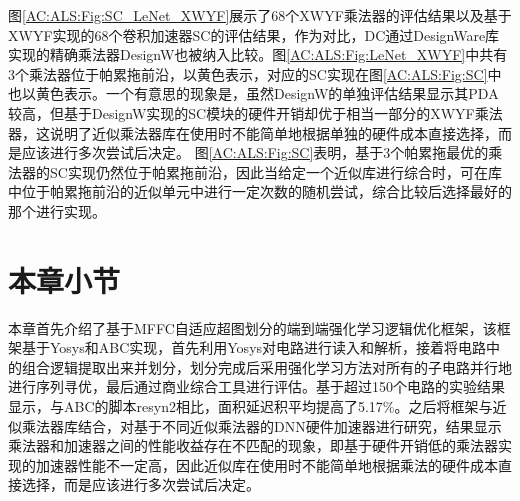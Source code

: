 图\ref{AC:ALS:Fig:SC_LeNet_XWYF}展示了68个XWYF乘法器的评估结果以及基于XWYF实现的68个卷积加速器SC\cite{Accelerator:SC}的评估结果，作为对比，DC通过DesignWare库\cite{IP:DesignWare}实现的精确乘法器DesignW也被纳入比较。图\ref{AC:ALS:Fig:LeNet_XWYF}中共有3个乘法器位于帕累拖前沿，以黄色表示，对应的SC实现在图\ref{AC:ALS:Fig:SC}中也以黄色表示。一个有意思的现象是，虽然DesignW的单独评估结果显示其PDA较高，但基于DesignW实现的SC模块的硬件开销却优于相当一部分的XWYF乘法器，这说明了近似乘法器库在使用时不能简单地根据单独的硬件成本直接选择，而是应该进行多次尝试后决定。
图\ref{AC:ALS:Fig:SC}表明，基于3个帕累拖最优的乘法器的SC实现仍然位于帕累拖前沿，因此当给定一个近似库进行综合时，可在库中位于帕累拖前沿的近似单元中进行一定次数的随机尝试，综合比较后选择最好的那个进行实现。

\section{本章小节}

本章首先介绍了基于MFFC自适应超图划分的端到端强化学习逻辑优化框架，该框架基于Yosys和ABC实现，首先利用Yosys对电路进行读入和解析，接着将电路中的组合逻辑提取出来并划分，划分完成后采用强化学习方法对所有的子电路并行地进行序列寻优，最后通过商业综合工具进行评估。基于超过150个电路的实验结果显示，与ABC的脚本resyn2相比，面积延迟积平均提高了5.17\%。之后将框架与近似乘法器库结合，对基于不同近似乘法器的DNN硬件加速器进行研究，结果显示乘法器和加速器之间的性能收益存在不匹配的现象，即基于硬件开销低的乘法器实现的加速器性能不一定高，因此近似库在使用时不能简单地根据乘法的硬件成本直接选择，而是应该进行多次尝试后决定。